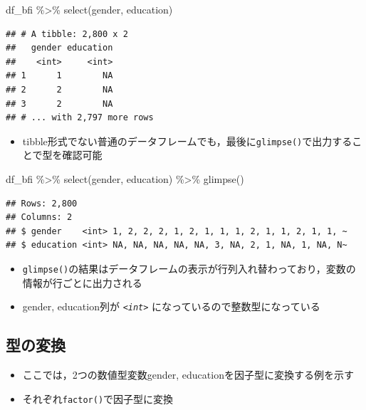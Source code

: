 \documentclass[
  xelatex,ja=standard, b5paper]{bxjsbook}
\newenvironment{Shaded}{\begin{snugshade}}{\end{snugshade}}
\newcommand{\FunctionTok}[1]{\textcolor[rgb]{0.00,0.00,0.00}{#1}}
\newcommand{\NormalTok}[1]{#1}
\newcommand{\SpecialCharTok}[1]{\textcolor[rgb]{0.00,0.00,0.00}{#1}}
\providecommand{\tightlist}{%
  \setlength{\itemsep}{0pt}\setlength{\parskip}{0pt}}
\begin{document}
\begin{Shaded}
\begin{Highlighting}[]
\NormalTok{df\_bfi }\SpecialCharTok{\%\textgreater{}\%} 
  \FunctionTok{select}\NormalTok{(gender, education)}
\end{Highlighting}
\end{Shaded}

\begin{verbatim}
## # A tibble: 2,800 x 2
##   gender education
##    <int>     <int>
## 1      1        NA
## 2      2        NA
## 3      2        NA
## # ... with 2,797 more rows
\end{verbatim}

\begin{itemize}
\tightlist
\item
  tibble形式でない普通のデータフレームでも，最後に\texttt{glimpse()}で出力することで型を確認可能
\end{itemize}

\begin{Shaded}
\begin{Highlighting}[]
\NormalTok{df\_bfi }\SpecialCharTok{\%\textgreater{}\%}
  \FunctionTok{select}\NormalTok{(gender, education) }\SpecialCharTok{\%\textgreater{}\%}
  \FunctionTok{glimpse}\NormalTok{()}
\end{Highlighting}
\end{Shaded}

\begin{verbatim}
## Rows: 2,800
## Columns: 2
## $ gender    <int> 1, 2, 2, 2, 1, 2, 1, 1, 1, 2, 1, 1, 2, 1, 1, ~
## $ education <int> NA, NA, NA, NA, NA, 3, NA, 2, 1, NA, 1, NA, N~
\end{verbatim}

\begin{itemize}
\tightlist
\item
  \texttt{glimpse()}の結果はデータフレームの表示が行列入れ替わっており，変数の情報が行ごとに出力される
\item
  gender, education列が \emph{\texttt{\textless{}int\textgreater{}}} になっているので整数型になっている
\end{itemize}

\hypertarget{mu-kata-trans}{%
\subsection{型の変換}\label{mu-kata-trans}}

\begin{itemize}
\tightlist
\item
  ここでは，2つの数値型変数gender, educationを因子型に変換する例を示す
\item
  それぞれ\texttt{factor()}で因子型に変換
\end{itemize}
\end{document}

